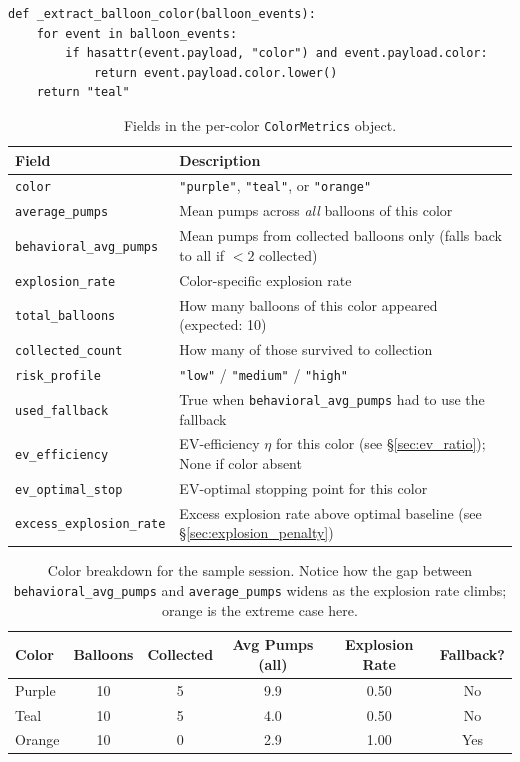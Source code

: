 \documentclass[11pt,a4paper]{article}
\begin{document}
\begin{lstlisting}[style=pythonstyle]
def _extract_balloon_color(balloon_events):
    for event in balloon_events:
        if hasattr(event.payload, "color") and event.payload.color:
            return event.payload.color.lower()
    return "teal"
\end{lstlisting}

\begin{table}[H]
\centering
\begin{tabular}{@{}lp{8.5cm}@{}}
\toprule
\textbf{Field} & \textbf{Description} \\
\midrule
\texttt{color}                  & \texttt{"purple"}, \texttt{"teal"}, or \texttt{"orange"} \\
\texttt{average\_pumps}         & Mean pumps across \emph{all} balloons of this color \\
\texttt{behavioral\_avg\_pumps} & Mean pumps from collected balloons only (falls back to all if $< 2$ collected) \\
\texttt{explosion\_rate}        & Color-specific explosion rate \\
\texttt{total\_balloons}        & How many balloons of this color appeared (expected: 10) \\
\texttt{collected\_count}       & How many of those survived to collection \\
\texttt{risk\_profile}          & \texttt{"low"} / \texttt{"medium"} / \texttt{"high"} \\
\texttt{used\_fallback}         & True when \texttt{behavioral\_avg\_pumps} had to use the fallback \\
\texttt{ev\_efficiency}         & EV-efficiency $\eta$ for this color (see \S\ref{sec:ev_ratio}); None if color absent \\
\texttt{ev\_optimal\_stop}      & EV-optimal stopping point for this color \\
\texttt{excess\_explosion\_rate}& Excess explosion rate above optimal baseline (see \S\ref{sec:explosion_penalty}) \\
\bottomrule
\end{tabular}
\caption{Fields in the per-color \texttt{ColorMetrics} object.}
\end{table}

\begin{table}[H]
\centering
\begin{tabular}{@{}lccccc@{}}
\toprule
\textbf{Color} & \textbf{Balloons} & \textbf{Collected} & \textbf{Avg Pumps (all)} & \textbf{Explosion Rate} & \textbf{Fallback?} \\
\midrule
Purple & 10 & 5 & 9.9  & 0.50 & No \\
Teal   & 10 & 5 & 4.0  & 0.50 & No \\
Orange & 10 & 0 & 2.9  & 1.00 & Yes \\
\bottomrule
\end{tabular}
\caption{Color breakdown for the sample session.  Notice how the gap between
\texttt{behavioral\_avg\_pumps} and \texttt{average\_pumps} widens as the
explosion rate climbs; orange is the extreme case here.}
\end{table}
\end{document}
